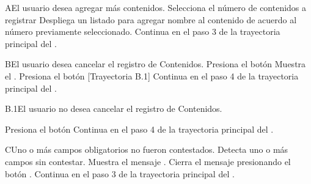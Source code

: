 \begin{UCtrayectoriaA}{A}{El usuario desea agregar más contenidos.}
    \UCpaso[\UCactor] Selecciona el número de contenidos a registrar
    \UCpaso Despliega un listado para agregar nombre al contenido de acuerdo al número previamente seleccionado.
    \UCpaso Continua en el paso 3 de la trayectoria principal del .

\end{UCtrayectoriaA}

\begin{UCtrayectoriaA}{B}{El usuario desea cancelar el registro de Contenidos.}
    \UCpaso[\UCactor] Presiona el botón 
    \UCpaso Muestra el .
    \UCpaso[\UCactor] Presiona el botón  [Trayectoria B.1]
    \UCpaso Continua en el paso 4 de la trayectoria principal del .

\end{UCtrayectoriaA}

\begin{UCtrayectoriaA}{B.1}{El usuario no desea cancelar el registro de Contenidos.}

    \UCpaso[\UCactor] Presiona el botón 
    \UCpaso Continua en el paso 4 de la trayectoria principal del .

\end{UCtrayectoriaA}


\begin{UCtrayectoriaA}{C}{Uno o más campos obligatorios no fueron contestados.}
  \UCpaso Detecta uno o más campos sin contestar.
    \UCpaso Muestra el mensaje .
    \UCpaso[\UCactor] Cierra el mensaje presionando el botón .
    \UCpaso Continua en el paso 3 de la trayectoria principal del .
\end{UCtrayectoriaA}
